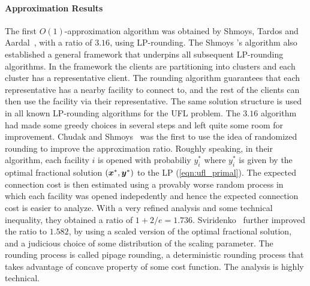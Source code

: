 \documentclass[oneside,final]{ucr}
\begin{document}
\paragraph{Approximation Results}
The first $O(1)$-approximation algorithm was obtained by
Shmoys, Tardos and Aardal~\cite{ShmoysTA97}, with a ratio of
$3.16$, using LP-rounding. The Shmoys {\etal}'s algorithm
also established a general framework that underpins all
subsequent LP-rounding algorithms. In the framework the
clients are partitioning into clusters and each cluster has
a representative client. The rounding algorithm guarantees
that each representative has a nearby facility to connect
to, and the rest of the clients can then use the facility
via their representative. The same solution structure is
used in all known LP-rounding algorithms for the UFL
problem. The $3.16$ algorithm had made some greedy choices
in several steps and left quite some room for
improvement. Chudak and Shmoys~\cite{ChudakS04} was the
first to use the idea of randomized rounding to improve the
approximation ratio. Roughly speaking, in their algorithm,
each facility $i$ is opened with probabiliy $y_i^\ast$ where
$y_i^\ast$ is given by the optimal fractional solution
$(\boldsymbol{x}^\ast,\boldsymbol{y}^\ast)$ to the LP
(\ref{eqn:ufl_primal}). The expected connection cost is then
estimated using a provably worse random process in which
each facility was opened indepedently and hence the expected
connection cost is easier to analyze. With a very refined
analysis and some technical inequality, they obtained a
ratio of $1+2/e = 1.736$. Sviridenko~\cite{Svi02} further
improved the ratio to $1.582$, by using a scaled version of
the optimal fractional solution, and a judicious choice of
some distribution of the scaling parameter. The rounding
process is called pipage rounding, a deterministic rounding
process that takes advantage of concave property of some
cost function. The analysis is highly technical.
\end{document}
